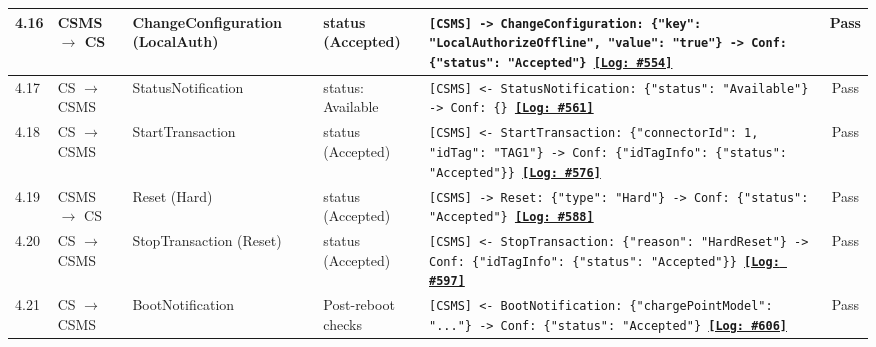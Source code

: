 \documentclass[10pt, a4paper, landscape]{article}
\begin{document}
\begin{longtable}{|p{1.0cm}|p{2.5cm}|p{4.0cm}|p{5.0cm}|p{10.0cm}|c|}
\hline
4.16 & CSMS $\to$ CS & ChangeConfiguration (LocalAuth) & status (Accepted) & \footnotesize\texttt{[CSMS] -> ChangeConfiguration: \{"key": "LocalAuthorizeOffline", "value": "true"\} \newline [CS] -> Conf: \{"status": "Accepted"\} \newline \hyperref[log:4.16]{\textbf{[Log: \#554]}}} & Pass \\
\hline
4.17 & CS $\to$ CSMS & StatusNotification & status: Available & \footnotesize\texttt{[CSMS] <- StatusNotification: \{"status": "Available"\} \newline [CSMS] -> Conf: \{\} \newline \hyperref[log:4.17]{\textbf{[Log: \#561]}}} & Pass \\
\hline
4.18 & CS $\to$ CSMS & StartTransaction & status (Accepted) & \footnotesize\texttt{[CSMS] <- StartTransaction: \{"connectorId": 1, "idTag": "TAG1"\} \newline [CSMS] -> Conf: \{"idTagInfo": \{"status": "Accepted"\}\} \newline \hyperref[log:4.18]{\textbf{[Log: \#576]}}} & Pass \\
\hline
4.19 & CSMS $\to$ CS & Reset (Hard) & status (Accepted) & \footnotesize\texttt{[CSMS] -> Reset: \{"type": "Hard"\} \newline [CS] -> Conf: \{"status": "Accepted"\} \newline \hyperref[log:4.19]{\textbf{[Log: \#588]}}} & Pass \\
\hline
4.20 & CS $\to$ CSMS & StopTransaction (Reset) & status (Accepted) & \footnotesize\texttt{[CSMS] <- StopTransaction: \{"reason": "HardReset"\} \newline [CSMS] -> Conf: \{"idTagInfo": \{"status": "Accepted"\}\} \newline \hyperref[log:4.20]{\textbf{[Log: \#597]}}} & Pass \\
\hline
4.21 & CS $\to$ CSMS & BootNotification & Post-reboot checks & \footnotesize\texttt{[CSMS] <- BootNotification: \{"chargePointModel": "..."\} \newline [CSMS] -> Conf: \{"status": "Accepted"\} \newline \hyperref[log:4.21]{\textbf{[Log: \#606]}}} & Pass \\
\hline


\end{longtable}
\end{document}
